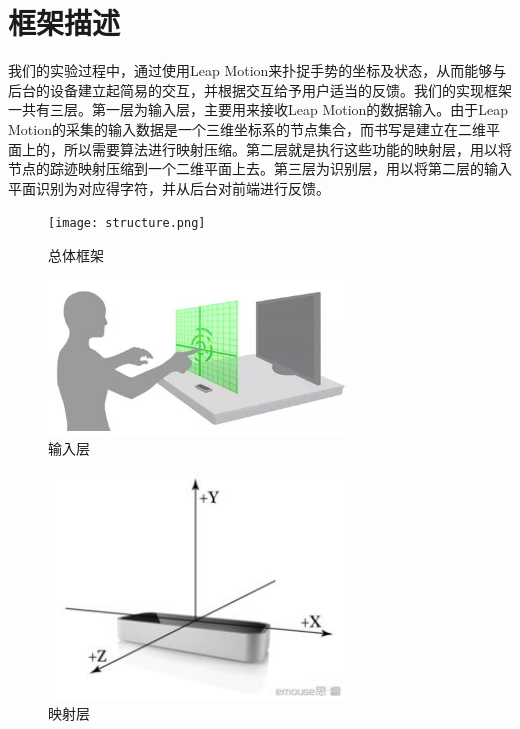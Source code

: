 \documentclass[10pt, twocolumn]{article}
\begin{document}
\section{框架描述}
	我们的实验过程中，通过使用Leap Motion来扑捉手势的坐标及状态，从而能够与后台的设备建立起简易的交互，并根据交互给予用户适当的反馈。我们的实现框架一共有三层。第一层为输入层，主要用来接收Leap Motion的数据输入。由于Leap Motion的采集的输入数据是一个三维坐标系的节点集合，而书写是建立在二维平面上的，所以需要算法进行映射压缩。第二层就是执行这些功能的映射层，用以将节点的踪迹映射压缩到一个二维平面上去。第三层为识别层，用以将第二层的输入平面识别为对应得字符，并从后台对前端进行反馈。

\begin{figure}[htb]
\centering
\begin{minipage}[t]{1\linewidth}
\centering
\texttt{[image: structure.png]}
\caption{总体框架}
\label{fig: sample_cnn}
\end{minipage}
\end{figure}



\begin{figure}[htb]
\centering
\begin{minipage}[t]{1\linewidth}
\centering
\includegraphics[width=8cm]{input.jpg}
\caption{输入层}
\label{fig: sample_cnn}
\end{minipage}
\end{figure}



\begin{figure}[htb]
\centering
\begin{minipage}[t]{1\linewidth}
\centering
\includegraphics[width=8cm, height = 6cm]{map.jpg}
\caption{映射层}
\label{fig: sample_cnn}
\end{minipage}
\end{figure}
\end{document}
